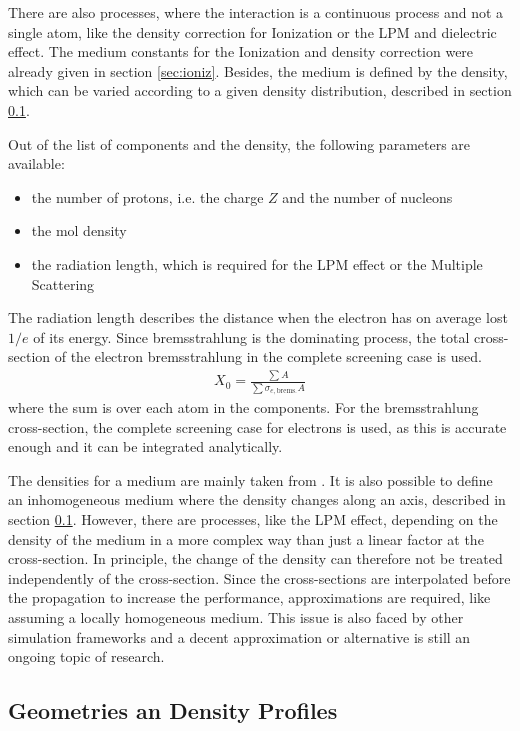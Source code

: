 There are also processes, where the interaction is a continuous process and not a single atom, like the density correction for Ionization or the LPM and dielectric effect.
The medium constants for the Ionization and density correction were already given in section \ref{sec:ioniz}.
Besides, the medium is defined by the density, which can be varied according to a given density distribution, described in section \ref{sec:geometry_density}.

Out of the list of components and the density, the following parameters are available:
\begin{itemize}
    \item the number of protons, i.e. the charge $Z$ and the number of nucleons
    \item the mol density
    \item the radiation length, which is required for the LPM effect or the Multiple Scattering
\end{itemize}
The radiation length describes the distance when the electron has on average lost $1/e$ of its energy.
Since bremsstrahlung is the dominating process, the total cross-section of the electron bremsstrahlung in the complete screening case is used.
\begin{align}
    X_0 = \frac{\sum A}{\sum \sigma_{e, \text{brems.}} A}
\end{align}
where the sum is over each atom in the components.
For the bremsstrahlung cross-section, the complete screening case for electrons is used, as this is accurate enough and it can be integrated analytically.

The densities for a medium are mainly taken from \cite{PDG20}.
It is also possible to define an inhomogeneous medium where the density changes along an axis, described in section \ref{sec:geometry_density}.
However, there are processes, like the LPM effect, depending on the density of the medium in a more complex way than just a linear factor at the cross-section.
In principle, the change of the density can therefore not be treated independently of the cross-section.
Since the cross-sections are interpolated before the propagation to increase the performance, approximations are required, like assuming a locally homogeneous medium.
This issue is also faced by other simulation frameworks and a decent approximation or alternative is still an ongoing topic of research.

%

\subsection{Geometries an Density Profiles} \label{sec:geometry_density}

